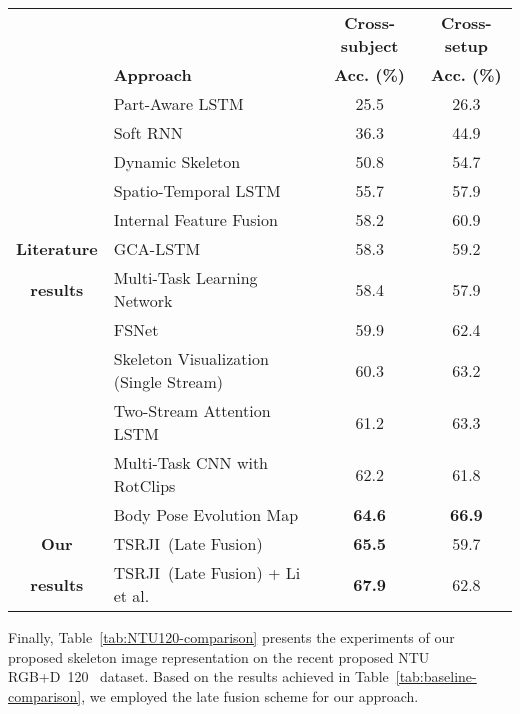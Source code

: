 \documentclass[10pt,conference]{IEEEtran}
\def\sigla{TSRJI}
\begin{document}
\begin{table*}[h!]
	\centering
	\begin{small}
		\caption{Action recognition accuracy (\%) results on NTU RGB+D~120~\cite{Liu:2019} dataset. Results for literature methods were obtained from~\cite{Liu:2019}.}
		\begin{tabular}{clcc}
			\toprule
			& & \multicolumn{1}{c}{\textbf{Cross-subject}} & \multicolumn{1}{c}{\textbf{Cross-setup}} \\
			& \textbf{Approach} & \multicolumn{1}{c}{\textbf{Acc. (\%)}} & \multicolumn{1}{c}{\textbf{Acc. (\%)}} \\
			\toprule
			
			& Part-Aware LSTM~\cite{Shahroudy:2016} & 25.5 & 26.3 \\
			& Soft RNN~\cite{Hu:2018} & 36.3 & 44.9 \\
			& Dynamic Skeleton~\cite{Hu:2017} & 50.8 & 54.7 \\
			& Spatio-Temporal LSTM~\cite{Liu:2016} & 55.7 & 57.9 \\
			& Internal Feature Fusion~\cite{Liu:2018} & 58.2 & 60.9 \\
			\multirow{1}{*}{\textbf{Literature}} & GCA-LSTM~\cite{Liu:2017b} & 58.3 & 59.2 \\
			\multirow{1}{*}{\textbf{results}} & Multi-Task Learning Network~\cite{Ke:2017} & 58.4 & 57.9 \\
			& FSNet~\cite{Liu:2019b} & 59.9 & 62.4 \\
			& Skeleton Visualization (Single Stream)~\cite{Liu:2017c} & 60.3 & 63.2 \\
			& Two-Stream Attention LSTM~\cite{Liu:2018b} & 61.2 & 63.3 \\
			& Multi-Task CNN with RotClips~\cite{Ke:2018} & 62.2 & 61.8 \\
			& Body Pose Evolution Map~\cite{Liu:2018c} & \textbf{64.6} & \textbf{66.9} \\
			
			\midrule
\multirow{1}{*}{\textbf{Our}} & \sigla~(Late Fusion) & \textbf{65.5} & 59.7  \\ \multirow{1}{*}{\textbf{results}} & \sigla~(Late Fusion) + Li et al.~\cite{Li:2018} & \textbf{67.9} & 62.8  \\ \bottomrule
		\end{tabular}
		\label{tab:NTU120-comparison}
	\end{small}
\end{table*}

Finally, Table~\ref{tab:NTU120-comparison} presents the experiments of our proposed skeleton image representation on the recent proposed NTU RGB+D~120~\cite{Liu:2019} dataset. Based on the results achieved in Table~\ref{tab:baseline-comparison}, we employed the late fusion scheme for our approach.
\end{document}
